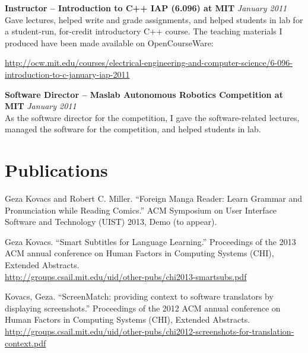 \documentclass[margin,line]{resume}
\begin{document}
\begin{resume}
\textbf{Instructor -- Introduction to C++ IAP (6.096) at MIT} \hfill \textsl{January 2011}\\
Gave lectures, helped write and grade assignments, and helped students in lab for a student-run, for-credit introductory C++ course. The teaching materials I produced have been made available on OpenCourseWare:

\vspace{-4mm}

\url{http://ocw.mit.edu/courses/electrical-engineering-and-computer-science/6-096-introduction-to-c-january-iap-2011} \\

\vspace{-5mm}

\textbf{Software Director -- Maslab Autonomous Robotics Competition at MIT} \hfill \textsl{January 2011}\\
As the software director for the competition, I gave the software-related lectures,
managed the software for the competition, and helped students in lab.



\section{\mysidestyle Publications}

Geza Kovacs and Robert C. Miller. ``Foreign Manga Reader: Learn Grammar and Pronunciation while Reading Comics.'' ACM Symposium on User Interface Software and Technology (UIST) 2013, Demo (to appear).

Geza Kovacs. ``Smart Subtitles for Language Learning.'' Proceedings of the 2013 ACM annual conference on Human Factors in Computing Systems (CHI), Extended Abstracts.\\
\url{http://groups.csail.mit.edu/uid/other-pubs/chi2013-smartsubs.pdf}

Kovacs, Geza. ``ScreenMatch: providing context to software translators by displaying screenshots.'' Proceedings of the 2012 ACM annual conference on Human Factors in Computing Systems (CHI), Extended Abstracts.\\
\url{http://groups.csail.mit.edu/uid/other-pubs/chi2012-screenshots-for-translation-context.pdf}


\end{resume}
\end{document}
